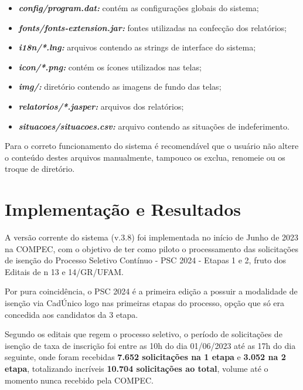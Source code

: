 \documentclass[
	12pt,			%
	openright,		%
	oneside,	
	a4paper,		%
	english,		%
	brazil			%
]{abntex2/abntex2}  %
\begin{document}
			\begin{itemize}
				
				\item \textbf{\textit{config/program.dat:}} contém as configurações globais do sistema;
				\item \textbf{\textit{fonts/fonts-extension.jar:}} fontes utilizadas na confecção dos relatórios;
				\item \textbf{\textit{i18n/*.lng:}} arquivos contendo as strings de interface do sistema;
				\item \textbf{\textit{icon/*.png:}} contém os ícones utilizados nas telas;
				\item \textbf{\textit{img/:}} diretório contendo as imagens de fundo das telas;
				\item \textbf{\textit{relatorios/*.jasper:}} arquivos dos relatórios;
				\item \textbf{\textit{situacoes/situacoes.csv:}} arquivo contendo as situações de indeferimento.
				
			\end{itemize}
			
			Para o correto funcionamento do sistema é recomendável que o usuário não altere o conteúdo destes arquivos manualmente, tampouco os exclua, renomeie ou os troque de diretório.

	\chapter{Implementação e Resultados}
	
		A versão corrente do sistema (v.3.8) foi implementada no início de Junho de 2023 na COMPEC, com o objetivo de ter como piloto o processamento das solicitações de isenção do Processo Seletivo Contínuo - PSC 2024 - Etapas 1 e 2, fruto dos Editais de n{\textdegree} 13 e 14/GR/UFAM.
		
		Por pura coincidência, o PSC 2024 é a primeira edição a possuir a modalidade de isenção via CadÚnico logo nas primeiras etapas do processo, opção que só era concedida aos candidatos da 3{\textordfeminine} etapa.
		
		Segundo os editais que regem o processo seletivo, o período de solicitações de isenção de taxa de inscrição foi entre as 10h do dia 01/06/2023 até as 17h do dia seguinte, onde foram recebidas \textbf{7.652 solicitações na 1{\textordfeminine} etapa} e \textbf{3.052 na 2{\textordfeminine} etapa}, totalizando incríveis \textbf{10.704 solicitações ao total}, volume até o momento nunca recebido pela COMPEC.
		
\end{document}
